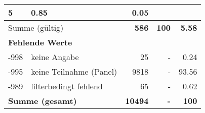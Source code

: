 \begin{longtable}{lXrrr}
       \num{5} &
       \num[round-mode=places,round-precision=2]{0.85} &
         \num[round-mode=places,round-precision=2]{0.05} \\
     \midrule
     \multicolumn{2}{l}{Summe (gültig)} &
       \textbf{\num{586}} &
     \textbf{\num{100}} &
       \textbf{\num[round-mode=places,round-precision=2]{5.58}} \\
     \multicolumn{5}{l}{\textbf{Fehlende Werte}}\\
       -998 &
       keine Angabe &
         \num{25} &
        - &
         \num[round-mode=places,round-precision=2]{0.24} \\
       -995 &
       keine Teilnahme (Panel) &
         \num{9818} &
        - &
         \num[round-mode=places,round-precision=2]{93.56} \\
       -989 &
       filterbedingt fehlend &
         \num{65} &
        - &
         \num[round-mode=places,round-precision=2]{0.62} \\
     \midrule
     \multicolumn{2}{l}{\textbf{Summe (gesamt)}} &
          \textbf{\num{10494}} &
        \textbf{-} &
        \textbf{\num{100}} \\
     \bottomrule
     \end{longtable}
     
